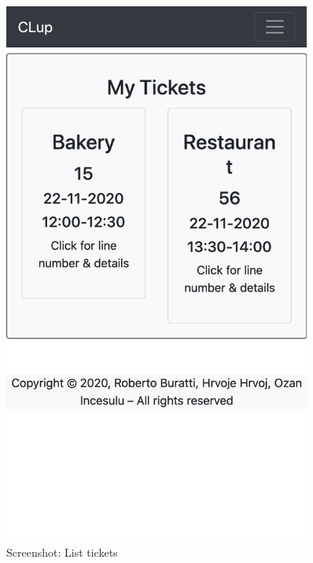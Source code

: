 \begin{figure}[H]
    \centering
    \begin{minipage}{0.45\textwidth}
        \centering
        \includegraphics[width=0.9\textwidth]{Images/Screenshots/ticketList.png}
        \caption{Screenshot: List tickets}
    \end{minipage}\hfill
    \begin{minipage}{0.45\textwidth}
        \centering

\end{minipage}
\end{figure}
